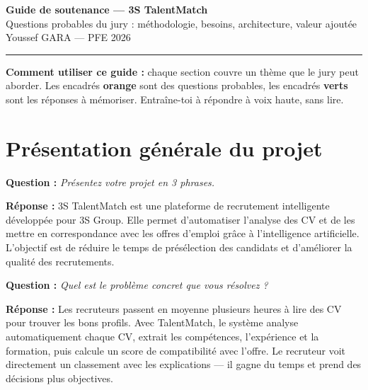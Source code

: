 \documentclass[12pt,a4paper]{article}
\newenvironment{jury}{%
  \def\FrameCommand{\fboxsep=8pt\colorbox{orange!12}}%
  \MakeFramed{\advance\hsize-\width \FrameRestore}%
  \vspace{-4pt}%
}{\endMakeFramed}
\newenvironment{reponse}{%
  \def\FrameCommand{\fboxsep=8pt\colorbox{green!10}}%
  \MakeFramed{\advance\hsize-\width \FrameRestore}%
  \vspace{-4pt}%
}{\endMakeFramed}
\newcommand{\Q}[1]{\vspace{6pt}\noindent\textbf{\color{orange}Question :} \textit{#1}}
\newcommand{\R}[1]{\noindent\textbf{\color{vert}Réponse :} #1\vspace{6pt}}
\begin{document}

\begin{center}
{\LARGE\bfseries\color{bleu} Guide de soutenance — 3S TalentMatch}\\[6pt]
{\large Questions probables du jury : méthodologie, besoins, architecture, valeur ajoutée}\\[4pt]
{\normalsize Youssef GARA — PFE 2026}
\end{center}
\vspace{4pt}
\hrule
\vspace{12pt}

\textbf{Comment utiliser ce guide :} chaque section couvre un thème que le jury peut aborder.
Les encadrés \textbf{orange} sont des questions probables, les encadrés \textbf{verts} sont les réponses à mémoriser.
Entraîne-toi à répondre à voix haute, sans lire.

\section{Présentation générale du projet}

\begin{jury}
\Q{Présentez votre projet en 3 phrases.}
\end{jury}

\begin{reponse}
\R{3S TalentMatch est une plateforme de recrutement intelligente développée pour 3S Group.
Elle permet d'automatiser l'analyse des CV et de les mettre en correspondance avec les offres d'emploi grâce à l'intelligence artificielle.
L'objectif est de réduire le temps de présélection des candidats et d'améliorer la qualité des recrutements.}
\end{reponse}

\begin{jury}
\Q{Quel est le problème concret que vous résolvez ?}
\end{jury}

\begin{reponse}
\R{Les recruteurs passent en moyenne plusieurs heures à lire des CV pour trouver les bons profils.
Avec TalentMatch, le système analyse automatiquement chaque CV, extrait les compétences, l'expérience et la formation, puis calcule un score de compatibilité avec l'offre.
Le recruteur voit directement un classement avec les explications — il gagne du temps et prend des décisions plus objectives.}
\end{reponse}
\end{document}
